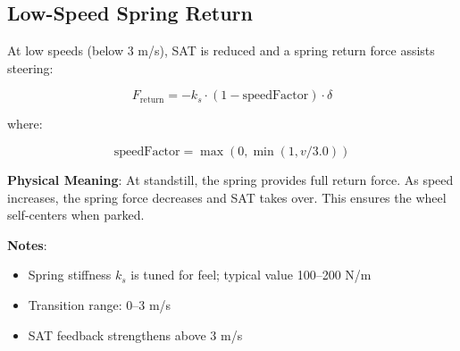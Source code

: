 \subsection{Low-Speed Spring Return}

At low speeds (below 3 m/s), SAT is reduced and a spring return force assists steering:

\begin{equation}
  F_{\text{return}} = -k_s \cdot (1 - \text{speedFactor}) \cdot \delta
  \label{eq:spring-return}
\end{equation}

where:

\begin{equation}
  \text{speedFactor} = \max(0, \min(1, v / 3.0))
  \label{eq:speed-factor}
\end{equation}

\textbf{Physical Meaning}: At standstill, the spring provides full return force. As speed increases, the spring force decreases and SAT takes over. This ensures the wheel self-centers when parked.

\textbf{Notes}:
\begin{itemize}
  \item Spring stiffness $k_s$ is tuned for feel; typical value 100–200 N/m
  \item Transition range: 0–3 m/s
  \item SAT feedback strengthens above 3 m/s
\end{itemize}

\newpage
